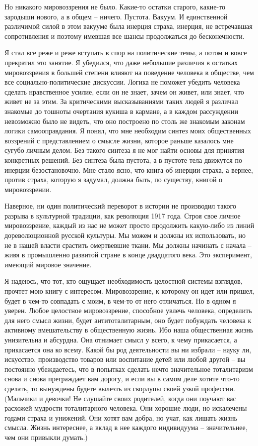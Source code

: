 \documentclass{book}
\begin{document}
Но никакого мировоззрения не было. Какие-то остатки старого, какие-то зародыши нового, а в общем -- ничего. Пустота. Вакуум. И единственной различимой силой в этом вакууме была инерция страха, инерция, не встречавшая сопротивления и поэтому имевшая все шансы продолжаться до бесконечности.

Я стал все реже и реже вступать в спор на политические те­мы, а потом и вовсе прекратил это занятие. Я убедился, что да­же небольшие различия в остатках мировоззрения в большей степени влияют на поведение человека в обществе, чем все со­циально-политические дискуссии. Логика не поможет убедить человека сделать нравственное усилие, если он не знает, зачем он живет, или знает, что живет не за этим. За критическими вы­сказываниями таких людей я различал знакомые до тошноты очертания кукиша в кармане, а в каждом рассуждении невоз­можно было не видеть, что оно построено по столь же знакомым законам логики самооправдания. Я понял, что мне необходим синтез моих общественных воззрений с представлением о смыс­ле жизни, которое раньше казалось мне сугубо личным делом. Без такого синтеза я не мог найти основы для принятия кон­кретных решений. Без синтеза была пустота, а в пустоте тела движутся по инерции безостановочно. Мне стало ясно, что книга об инерции страха, а вернее, против  страха, которую я задумал, должна 
быть, по существу, книгой о мировоззрении.

Наверное, ни один политический переворот в истории не про­изводил такого разрыва в культурной традиции, как револю­ция 1917 года. Строя свое личное мировоззрение, каждый из нас не может просто продолжить какую-либо из линий дорево­люционной русской культуры. Мы можем и должны их исполь­зовать, но не в нашей власти срастить омертвевшие ткани. Мы должны начинать с начала -- живя в промышленно развитой стране в конце двадцатого века. Это эксперимент, имеющий ми­ровое значение.

Я надеюсь, что тот, кто ощущает необходимость целостной системы взглядов, прочтет мою книгу с интересом. Мировоз­зрение, к которому он идет или пришел, будет в чем-то совпа­дать с моим, в чем-то от него отличаться. Но в одном я уверен. Любое целостное мировоззрение, способное увлечь человека, определить для него смысл жизни, будет антитоталитарным, оно будет побуждать человека к активному вмешательству в общественную жизнь. Ибо наша общественная жизнь унизитель­на и абсурдна. Она отнимает смысл у всего, к чему прикасается, а прикасается она ко всему. Какой бы род деятельности вы ни избрали -- науку ли, искусство, производство товаров или вос­питание детей или любой другой -- вы постоянно убеждаетесь, что в попытках сделать нечто значительное тоталитаризм снова и снова преграждает вам дорогу, и если вы в самом деле хоти­те что-то сделать, то вынуждены будете вылезть из скорлупы своей узкой профессии. (Мальчики и девочки! Не слушайте сво­их родителей, когда они поучают вас расхожей мудрости тота­литарного 
человека. Они хорошие люди, но искалечены годами страха и унижений. Они хотят вам добра, но учат, как лишать жизнь смысла. Жизнь интереснее, а вклад в нее каждого инди­видуума -- значительнее, чем они привыкли думать.)
\end{document}
